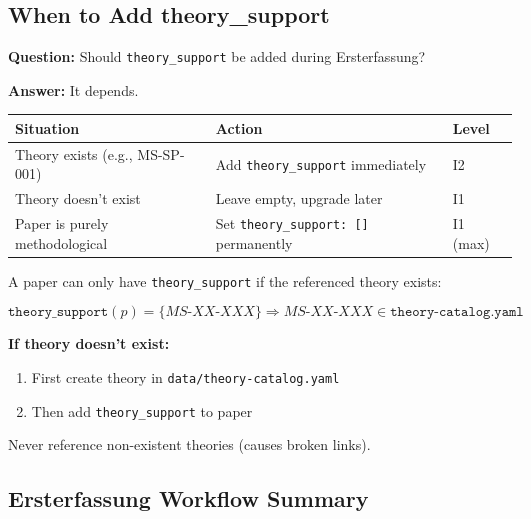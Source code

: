 \subsection{When to Add theory\_support}
\label{sec:ersterfassung-theory}

\textbf{Question:} Should \texttt{theory\_support} be added during Ersterfassung?

\textbf{Answer:} It depends.

\begin{table}[H]
\centering
\begin{tabular}{@{}lll@{}}
\toprule
\textbf{Situation} & \textbf{Action} & \textbf{Level} \\
\midrule
Theory exists (e.g., MS-SP-001) & Add \texttt{theory\_support} immediately & I2 \\
Theory doesn't exist & Leave empty, upgrade later & I1 \\
Paper is purely methodological & Set \texttt{theory\_support: []} permanently & I1 (max) \\
\bottomrule
\end{tabular}
\end{table}

\begin{tcolorbox}[colback=green!5!white, colframe=green!75!black,
    title=\textbf{Axiom ERST-3: Theory Must Exist Before Linking}]

A paper can only have \texttt{theory\_support} if the referenced theory exists:

\begin{equation}
\texttt{theory\_support}(p) = \{MS\text{-}XX\text{-}XXX\} \Rightarrow MS\text{-}XX\text{-}XXX \in \texttt{theory-catalog.yaml}
\end{equation}

\textbf{If theory doesn't exist:}
\begin{enumerate}[nosep]
    \item First create theory in \texttt{data/theory-catalog.yaml}
    \item Then add \texttt{theory\_support} to paper
\end{enumerate}

Never reference non-existent theories (causes broken links).

\end{tcolorbox}

\subsection{Ersterfassung Workflow Summary}
\label{sec:ersterfassung-summary}

